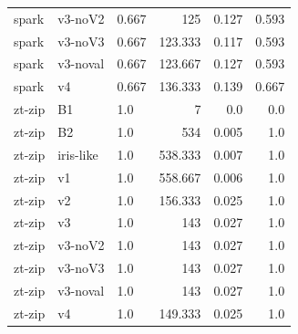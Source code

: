 \begin{table}[t]
{\begin{tabular}{lllrrr}
spark & v3-noV2 & 0.667 & 125 & 0.127 & 0.593 \\
spark & v3-noV3 & 0.667 & 123.333 & 0.117 & 0.593 \\
spark & v3-noval & 0.667 & 123.667 & 0.127 & 0.593 \\
spark & v4 & 0.667 & 136.333 & 0.139 & 0.667 \\
zt-zip & B1 & 1.0 & 7 & 0.0 & 0.0 \\
zt-zip & B2 & 1.0 & 534 & 0.005 & 1.0 \\
zt-zip & iris-like & 1.0 & 538.333 & 0.007 & 1.0 \\
zt-zip & v1 & 1.0 & 558.667 & 0.006 & 1.0 \\
zt-zip & v2 & 1.0 & 156.333 & 0.025 & 1.0 \\
zt-zip & v3 & 1.0 & 143 & 0.027 & 1.0 \\
zt-zip & v3-noV2 & 1.0 & 143 & 0.027 & 1.0 \\
zt-zip & v3-noV3 & 1.0 & 143 & 0.027 & 1.0 \\
zt-zip & v3-noval & 1.0 & 143 & 0.027 & 1.0 \\
zt-zip & v4 & 1.0 & 149.333 & 0.025 & 1.0 \\
\bottomrule
\end{tabular}}
\end{table}

